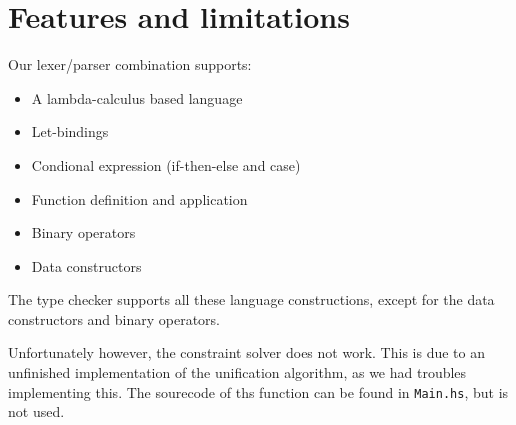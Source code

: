 \documentclass[10pt]{article}
\begin{document}
\section{Features and limitations}
Our lexer/parser combination supports:
\begin{itemize}
	\item A lambda-calculus based language
	\item Let-bindings
	\item Condional expression (if-then-else and case)
	\item Function definition and application
	\item Binary operators
	\item Data constructors
\end{itemize}
The type checker supports all these language constructions, except for the data constructors and binary operators.

Unfortunately however, the constraint solver does not work. This is due to an unfinished implementation of the unification algorithm, as we had troubles implementing this. The sourecode of ths function can be found in \texttt{Main.hs}, but is not used.
\end{document}
